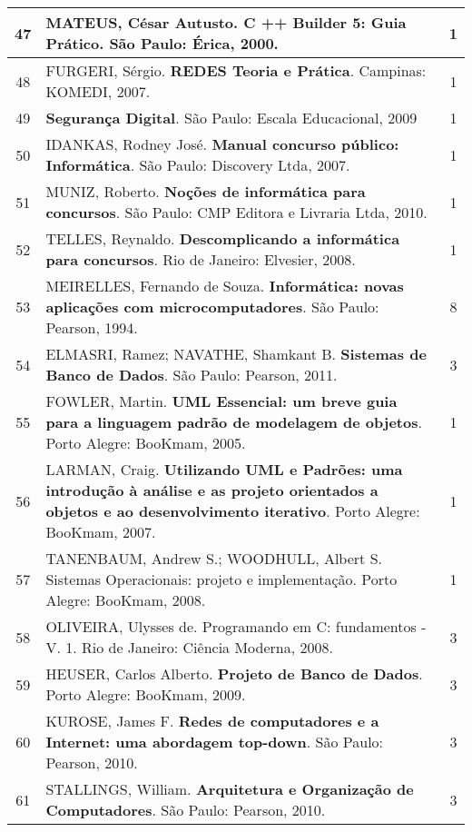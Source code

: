 \begin{longtable}{|c|p{115mm}|c|}
47     & MATEUS, César Autusto. \textbf{C ++ Builder 5: Guia Prático}. São Paulo: Érica, 2000. & 1          \\ \hline
48     & FURGERI, Sérgio. \textbf{REDES Teoria e Prática}. Campinas: KOMEDI, 2007.             & 1          \\ \hline
49     & \textbf{Segurança Digital}. São Paulo: Escala Educacional, 2009                       & 1          \\ \hline
50     & IDANKAS, Rodney José. \textbf{Manual concurso público: Informática}. São Paulo: Discovery Ltda, 2007. & 1          \\ \hline
51     & MUNIZ, Roberto. \textbf{Noções de informática para concursos}. São Paulo: CMP Editora e Livraria Ltda, 2010. & 1          \\ \hline
52     & TELLES, Reynaldo. \textbf{Descomplicando a informática para concursos}. Rio de Janeiro: Elvesier, 2008. & 1          \\ \hline
53     & MEIRELLES, Fernando de Souza. \textbf{Informática: novas aplicações com microcomputadores}. São Paulo: Pearson, 1994. & 8          \\ \hline
54     & ELMASRI, Ramez; NAVATHE, Shamkant B. \textbf{Sistemas de Banco de Dados}. São Paulo: Pearson, 2011. & 3          \\ \hline
55     & FOWLER, Martin. \textbf{UML Essencial: um breve guia para a linguagem padrão de modelagem de objetos}. Porto Alegre: BooKmam, 2005. & 1          \\ \hline
56     & LARMAN, Craig. \textbf{Utilizando UML e Padrões: uma introdução à análise e as projeto orientados a objetos e ao desenvolvimento iterativo}. Porto Alegre: BooKmam, 2007. & 1          \\ \hline
57     & TANENBAUM, Andrew S.; WOODHULL, Albert S. Sistemas Operacionais: projeto e implementação. Porto Alegre: BooKmam, 2008. & 1          \\ \hline
58     & OLIVEIRA, Ulysses de. Programando em C: fundamentos - V. 1. Rio de Janeiro: Ciência Moderna, 2008. & 3          \\ \hline
59     & HEUSER, Carlos Alberto. \textbf{Projeto de Banco de Dados}. Porto Alegre: BooKmam, 2009. & 3          \\ \hline
60     & KUROSE, James F. \textbf{Redes de computadores e a Internet: uma abordagem top-down}. São Paulo: Pearson, 2010. & 3          \\ \hline
61     & STALLINGS, William. \textbf{Arquitetura e Organização de Computadores}. São Paulo: Pearson, 2010. & 3          \\ \hline

\end{longtable}
